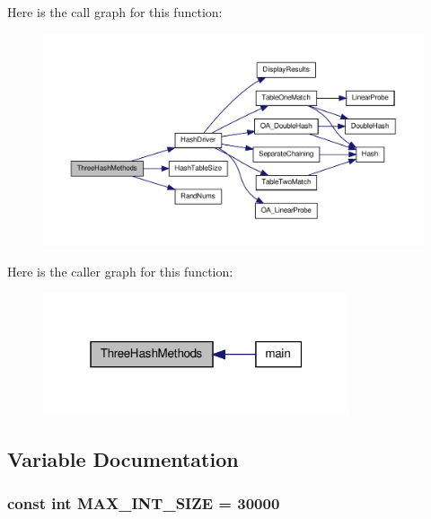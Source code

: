 Here is the call graph for this function:\nopagebreak
\begin{figure}[H]
\begin{center}
\leavevmode
\includegraphics[width=400pt]{_bradshaw-_mansfield-_assn2-_h_a_s_h_prog_8cpp_ac4885dc21b261220f2a030b1ad06aec5_cgraph}
\end{center}
\end{figure}




Here is the caller graph for this function:\nopagebreak
\begin{figure}[H]
\begin{center}
\leavevmode
\includegraphics[width=256pt]{_bradshaw-_mansfield-_assn2-_h_a_s_h_prog_8cpp_ac4885dc21b261220f2a030b1ad06aec5_icgraph}
\end{center}
\end{figure}




\subsection{Variable Documentation}
\hypertarget{_bradshaw-_mansfield-_assn2-_h_a_s_h_prog_8cpp_a80697a51c12117a5eae4ada58d27e1c2}{
\subsubsection[{MAX\_\-INT\_\-SIZE}]{\setlength{\rightskip}{0pt plus 5cm}const int {\bf MAX\_\-INT\_\-SIZE} = 30000}}
\label{_bradshaw-_mansfield-_assn2-_h_a_s_h_prog_8cpp_a80697a51c12117a5eae4ada58d27e1c2}



